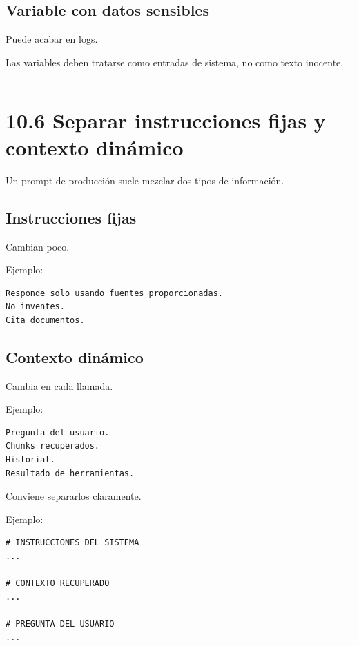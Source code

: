 \subsection{Variable con datos
sensibles}\label{variable-con-datos-sensibles}

Puede acabar en logs.

Las variables deben tratarse como entradas de sistema, no como texto
inocente.

\begin{center}\rule{0.5\linewidth}{0.5pt}\end{center}

\section{10.6 Separar instrucciones fijas y contexto
dinámico}\label{separar-instrucciones-fijas-y-contexto-dinuxe1mico}

Un prompt de producción suele mezclar dos tipos de información.

\subsection{Instrucciones fijas}\label{instrucciones-fijas}

Cambian poco.

Ejemplo:

\begin{lstlisting}
Responde solo usando fuentes proporcionadas.
No inventes.
Cita documentos.
\end{lstlisting}

\subsection{Contexto dinámico}\label{contexto-dinuxe1mico}

Cambia en cada llamada.

Ejemplo:

\begin{lstlisting}
Pregunta del usuario.
Chunks recuperados.
Historial.
Resultado de herramientas.
\end{lstlisting}

Conviene separarlos claramente.

Ejemplo:

\begin{lstlisting}
# INSTRUCCIONES DEL SISTEMA
...

# CONTEXTO RECUPERADO
...

# PREGUNTA DEL USUARIO
...
\end{lstlisting}

